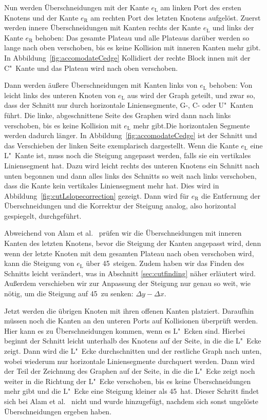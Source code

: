 \documentclass[a4paper]{scrreprt}
\theoremstyle{definition}
\begin{document}
Nun werden Überschneidungen mit der Kante $e_\text{L}$ am linken Port des ersten Knotens und der Kante $e_\text{R}$ am rechten Port des letzten Knotens aufgelöst. Zuerst werden innere Überschneidungen mit Kanten rechts der Kante $e_\text{L}$  und links der Kante $e_\text{R}$ behoben: Das gesamte Plateau und alle Plateaus darüber werden so lange nach oben verschoben, bis es keine Kollision mit inneren Kanten mehr gibt. In Abbildung~\ref{fig:accomodateCedge} Kollidiert der rechte Block innen mit der C"~Kante und das Plateau wird nach oben verschoben.

Dann werden äußere Überschneidungen mit Kanten links von $e_\text{L}$ behoben: Von leicht links des unteren Knoten von  $e_\text{L}$ aus wird der Graph geteilt, und zwar so, dass der Schnitt nur durch horizontale Liniensegmente, G-, C- oder U"~Kanten führt. Die linke, abgeschnittene Seite des Graphen wird dann nach links verschoben, bis es keine Kollision mit $e_\text{L}$ mehr gibt.Die horizontalen Segmente werden dadurch länger. In Abbildung~\ref{fig:accomodateCedge} ist der Schnitt und das Verschieben der linken Seite exemplarisch dargestellt. Wenn die Kante $e_\text{L}$ eine L"~Kante ist, muss noch die Steigung angepasst werden, falls sie ein vertikales Liniensegment hat. Dazu wird leicht rechts des unteren Knotens ein Schnitt nach unten begonnen und dann alles links des Schnitts so weit nach links verschoben, dass die Kante kein vertikales Liniensegment mehr hat. Dies wird in Abbildung~\ref{fig:cutLslopecorrection} gezeigt. Dann wird für $e_\text{R}$ die Entfernung der Überschneidungen und die Korrektur der Steigung analog, also horizontal gespiegelt, durchgeführt.


Abweichend von Alam et al.~\cite{smooth-13} prüfen wir die Überschneidungen mit inneren Kanten des letzten Knotens, bevor die Steigung der Kanten angepasst wird, denn wenn der letzte Knoten mit dem gesamten Plateau nach oben verschoben wird, kann die Steigung von $e_\text{L}$ über 45\textdegree\ steigen. Zudem haben wir das Finden des Schnitts leicht verändert, was in Abschnitt \ref{sec:cutfinding} näher erläutert wird. Außerdem verschieben wir zur Anpassung der Steigung nur genau so weit, wie nötig, um die Steigung auf 45\textdegree\ zu senken: $\Delta y - \Delta x$.

Jetzt werden die übrigen Knoten mit ihren offenen Kanten platziert. Daraufhin müssen noch die Kanten an den unteren Ports auf Kollisionen überprüft werden. Hier kann es zu Überschneidungen kommen, wenn es L"~Ecken sind. Hierbei beginnt der Schnitt leicht unterhalb des Knotens auf der Seite, in die die L"~Ecke zeigt. Dann wird die L"~Ecke durchschnitten und der restliche Graph nach unten, wobei wiederum nur horizontale Liniensegmente durchquert werden. Dann wird der Teil der Zeichnung des Graphen auf der Seite, in die die L"~Ecke zeigt noch weiter in die Richtung der L"~Ecke verschoben, bis es keine Überschneidungen mehr gibt und die L"~Ecke eine Steigung kleiner als 45\textdegree\ hat. Dieser Schritt findet sich bei Alam et al.~\cite{smooth-13} nicht und wurde hinzugefügt, nachdem sich sonst ungelöste Überschneidungen ergeben haben.
\end{document}
